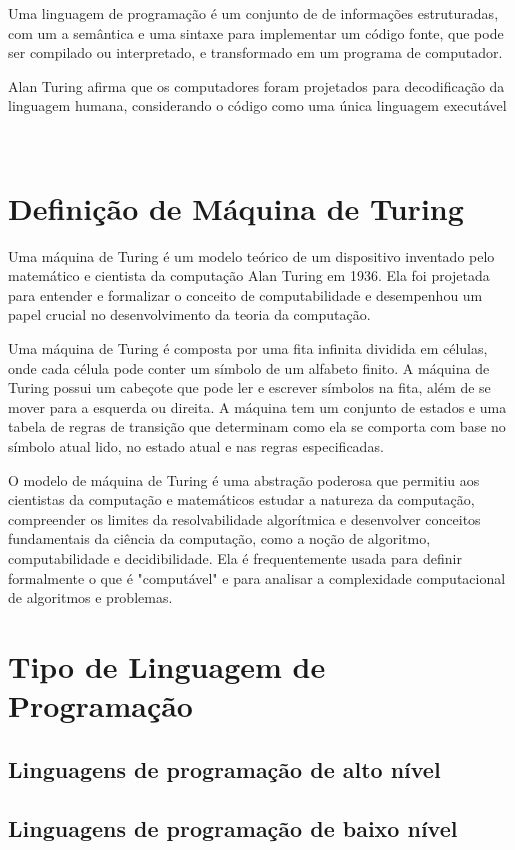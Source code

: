 \documentclass[tcc/ec]{faeng}
\begin{document}
Uma linguagem de programação é um conjunto de de informações estruturadas, com um a semântica e uma sintaxe para implementar um código fonte, que pode ser compilado ou interpretado, e transformado em um programa de computador.

Alan Turing afirma que os computadores foram projetados para decodificação da linguagem humana, considerando o código como uma única linguagem executável

\

\section{Definição de Máquina de Turing}
Uma máquina de Turing é um modelo teórico de um dispositivo inventado pelo matemático e cientista da computação Alan Turing em 1936. Ela foi projetada para entender e formalizar o conceito de computabilidade e desempenhou um papel crucial no desenvolvimento da teoria da computação.

Uma máquina de Turing é composta por uma fita infinita dividida em células, onde cada célula pode conter um símbolo de um alfabeto finito. A máquina de Turing possui um cabeçote que pode ler e escrever símbolos na fita, além de se mover para a esquerda ou direita. A máquina tem um conjunto de estados e uma tabela de regras de transição que determinam como ela se comporta com base no símbolo atual lido, no estado atual e nas regras especificadas.

O modelo de máquina de Turing é uma abstração poderosa que permitiu aos cientistas da computação e matemáticos estudar a natureza da computação, compreender os limites da resolvabilidade algorítmica e desenvolver conceitos fundamentais da ciência da computação, como a noção de algoritmo, computabilidade e decidibilidade. Ela é frequentemente usada para definir formalmente o que é "computável" e para analisar a complexidade computacional de algoritmos e problemas.

\section{Tipo de Linguagem de Programação}

\subsection{Linguagens de programação de alto nível}

\subsection{Linguagens de programação de baixo nível}
\end{document}
